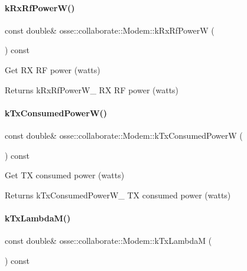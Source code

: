 \paragraph{\texorpdfstring{k\+Rx\+Rf\+Power\+W()}{kRxRfPowerW()}}
{\footnotesize\ttfamily const double\& osse\+::collaborate\+::\+Modem\+::k\+Rx\+Rf\+PowerW (\begin{DoxyParamCaption}{ }\end{DoxyParamCaption}) const\hspace{0.3cm}{\ttfamily [inline]}}



Get RX RF power (watts) 

\begin{DoxyReturn}{Returns}
k\+Rx\+Rf\+Power\+W\+\_\+ RX RF power (watts) 
\end{DoxyReturn}
\mbox{\label{classosse_1_1collaborate_1_1_modem_adc5837932829df64bacec3ed4bef6134}} 
\paragraph{\texorpdfstring{k\+Tx\+Consumed\+Power\+W()}{kTxConsumedPowerW()}}
{\footnotesize\ttfamily const double\& osse\+::collaborate\+::\+Modem\+::k\+Tx\+Consumed\+PowerW (\begin{DoxyParamCaption}{ }\end{DoxyParamCaption}) const\hspace{0.3cm}{\ttfamily [inline]}}



Get TX consumed power (watts) 

\begin{DoxyReturn}{Returns}
k\+Tx\+Consumed\+Power\+W\+\_\+ TX consumed power (watts) 
\end{DoxyReturn}
\mbox{\label{classosse_1_1collaborate_1_1_modem_a327712f883fdd72e91b238c018064998}} 
\paragraph{\texorpdfstring{k\+Tx\+Lambda\+M()}{kTxLambdaM()}}
{\footnotesize\ttfamily const double\& osse\+::collaborate\+::\+Modem\+::k\+Tx\+LambdaM (\begin{DoxyParamCaption}{ }\end{DoxyParamCaption}) const\hspace{0.3cm}{\ttfamily [inline]}}



